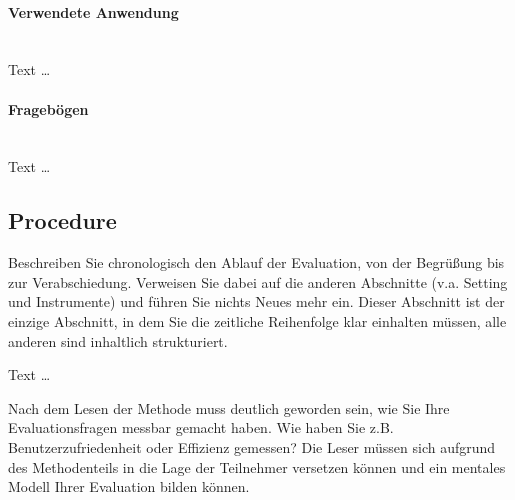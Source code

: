\documentclass[11pt,a4paper,english]{scrreprt}
\newenvironment{comment}
  {\par\medskip
   \begingroup\color{olive}%
   }
 {\endgroup
  \medskip}
\begin{document}
\paragraph{Verwendete Anwendung}\mbox{} \\
Text \dots

\paragraph{Fragebögen}\mbox{} \\
Text \dots

\subsection{Procedure}
\begin{comment}
Beschreiben Sie chronologisch den Ablauf der Evaluation, von der Begrüßung bis zur Verabschiedung. Verweisen Sie dabei auf die anderen Abschnitte (v.a. Setting und Instrumente) und führen Sie nichts Neues mehr ein. Dieser Abschnitt ist der einzige Abschnitt, in dem Sie die zeitliche Reihenfolge klar einhalten müssen, alle anderen sind inhaltlich strukturiert.
\end{comment}

Text \dots

\begin{comment}
Nach dem Lesen der Methode muss deutlich geworden sein, wie Sie Ihre Evaluationsfragen messbar gemacht haben. Wie haben Sie z.B. Benutzerzufriedenheit oder Effizienz gemessen? Die Leser müssen sich aufgrund des Methodenteils in die Lage der Teilnehmer versetzen können und ein mentales Modell Ihrer Evaluation bilden können.
\end{comment}
\end{document}
